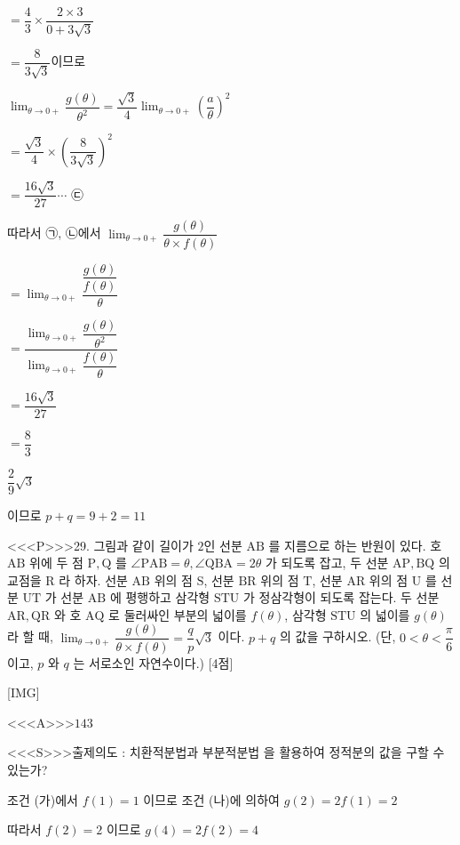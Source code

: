 \documentclass{oblivoir}
\begin{document}
$=\dfrac{4}{3} \times \dfrac{2 \times 3}{0+3 \sqrt{3}}$

$=\dfrac{8}{3 \sqrt{3}}$이므로

$\displaystyle\lim _{\theta \rightarrow 0+} \dfrac{g(\theta)}{\theta^{2}}=\dfrac{\sqrt{3}}{4} \displaystyle\lim _{\theta \rightarrow 0+}\left(\dfrac{a}{\theta}\right)^{2}$

$=\dfrac{\sqrt{3}}{4} \times\left(\dfrac{8}{3 \sqrt{3}}\right)^{2}$

$=\dfrac{16 \sqrt{3}}{27} \cdots$ ㉢

따라서 ㉠, ㉡에서
$\displaystyle\lim _{\theta \rightarrow 0+} \dfrac{g(\theta)}{\theta \times f(\theta)}$

$=\displaystyle\lim _{\theta \rightarrow 0+} \dfrac{\dfrac{g(\theta)}{f(\theta)}}{\theta}$

$=\dfrac{\displaystyle\lim _{\theta \rightarrow 0+} \dfrac{g(\theta)}{\theta^{2}}}{\displaystyle\lim _{\theta \rightarrow 0+} \dfrac{f(\theta)}{\theta}}$

$=\dfrac{16 \sqrt{3}}{27}$

$=\dfrac{8}{3}$

$\dfrac{2}{9} \sqrt{3}$

이므로 $p+q=9+2=11$


<<<P>>>29. 그림과 같이 길이가 $2$인 선분 $\mathrm{AB}$ 를 지름으로 하는 반원이 있다. 호 $\mathrm{AB}$ 위에 두 점 $\mathrm{P}, \mathrm{Q}$ 를 $\angle \mathrm{PAB}=\theta, \angle \mathrm{QBA}=2 \theta$ 가 되도록 잡고, 두 선분 $\mathrm{AP}, \mathrm{BQ}$ 의 교점을 $\mathrm{R}$ 라 하자.
선분 $\mathrm{AB}$ 위의 점 $\mathrm{S}$, 선분 $\mathrm{BR}$ 위의 점 $\mathrm{T}$, 선분 $\mathrm{AR}$ 위의 점 $\mathrm{U}$ 를 선분 $\mathrm{UT}$ 가 선분 $\mathrm{AB}$ 에 평행하고 삼각형 $\mathrm{STU}$ 가 정삼각형이 되도록 잡는다. 두 선분 $\mathrm{AR}, \mathrm{QR}$ 와 호 $\mathrm{AQ}$ 로 둘러싸인 부분의 넓이를 $f(\theta)$, 삼각형 $\mathrm{STU}$ 의 넓이를 $g(\theta)$ 라 할 때, $\displaystyle\lim _{\theta \rightarrow 0+} \dfrac{g(\theta)}{\theta \times f(\theta)}=\dfrac{q}{p} \sqrt{3}$ 이다. $p+q$ 의 값을 구하시오. (단, $0<  \theta<  \dfrac{\pi}{6}$ 이고, $p$ 와 $q$ 는 서로소인 자연수이다.) [4점]

[IMG]

<<<A>>>$143$

<<<S>>>출제의도 : 치환적분법과 부분적분법 을 활용하여 정적분의 값을 구할 수 있는가?

조건 (가)에서 $f(1)=1$ 이므로 조건 (나)에 의하여
$g(2)=2 f(1)=2$

따라서 $f(2)=2$ 이므로
$g(4)=2 f(2)=4$
\end{document}
